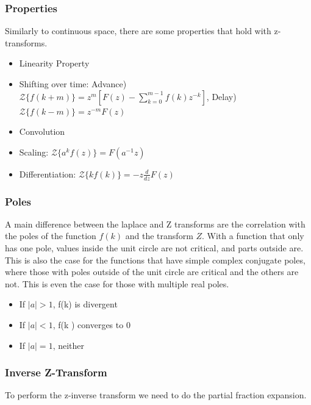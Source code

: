 \documentclass[11pt]{article}
\begin{document}
\subsubsection{Properties}
Similarly to continuous space, there are some properties that hold with z-transforms.
\begin{itemize}
  \item Linearity Property
  \item Shifting over time: Advance)  $\mathcal{Z}\{ f(k+m) \} = z^m [F(z)- \sum_{k=0}^{m-1}f(k)z^{-k}]$, Delay) $\mathcal{Z}\{ f(k-m) \} = z^{-m} F(z)$
  \item Convolution
  \item Scaling: $\mathcal{Z}\{ a^k f(z) \} = F(a^{-1} z)$
  \item Differentiation: $\mathcal{Z}\{ k f(k) \} = -z \frac{d }{d z} F(z) $
\end{itemize}

\subsubsection{Poles}
A main difference between the laplace and Z transforms are the correlation with the poles of the function $f(k)$ and the transform $Z$.
With a function that only has one pole, values inside the unit circle are not critical, and parts outside are.
This is also the case for the functions that have simple complex conjugate poles, where those with poles outside of the unit circle are critical and the others are not.
This is even the case for those with multiple real poles.
\begin{itemize}
  \item If $|a| > 1$, f(k) is divergent
  \item If $|a| < 1$, f(k ) converges to 0
  \item If $|a| = 1$, neither
\end{itemize}

\subsubsection{Inverse Z-Transform}
To perform the z-inverse transform we need to do the partial fraction expansion.
\end{document}
